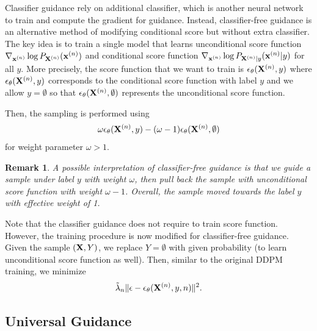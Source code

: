 \documentclass[11pt]{article}
\newtheorem{remark}{Remark}
\begin{document}
Classifier guidance rely on additional classifier, which is another neural network to train and compute the gradient for guidance.
Instead, classifier-free guidance is an alternative method of modifying conditional score but without extra classifier.
The key idea is to train a single model that learns unconditional score function $\nabla_{{\bf x}^{(n)}} \log P_{{\bf X}^{(n)}}({\bf x}^{(n)})$ and
conditional score function $\nabla_{{\bf x}^{(n)}} \log P_{{\bf X}^{(n)}|y}({\bf x}^{(n)}|y)$ for all $y$.
More precisely, the score function that we want to train is $\epsilon_\theta({\bf X}^{(n)}, y)$ where
$\epsilon_\theta({\bf X}^{(n)}, y)$ corresponds to the conditional score function with label $y$
and we allow $y=\emptyset$ so that $\epsilon_\theta({\bf X}^{(n)}, \emptyset)$ represents the unconditional score function.

Then, the sampling is performed using
\begin{align}
    \omega \epsilon_{\theta}({\bf X}^{(n)}, y) -  (\omega-1) \epsilon_{\theta}({\bf X}^{(n)}, \emptyset) 
\end{align}
for weight parameter $\omega > 1$.
\begin{remark}
    A possible interpretation of classifier-free guidance is that we guide a sample under label $y$ with weight $\omega$,
    then pull back the sample with unconditional score function with weight $\omega-1$.
    Overall, the sample moved towards the label $y$ with effective weight of 1.
\end{remark}

Note that the classifier guidance does not require to train score function.
However, the training procedure is now modified for classifier-free guidance.
Given the sample $({\bf X}, Y)$, we replace $Y=\emptyset$ with given probability (to learn unconditional score function as well).
Then, similar to the original DDPM training, we minimize
\begin{align}
     \tilde{\lambda}_n \| \epsilon - \epsilon_{\theta}({\bf X}^{(n)}, y, n)\|^2.
\end{align}



\subsection{Universal Guidance~\cite{bansal2024universal}}
\end{document}
